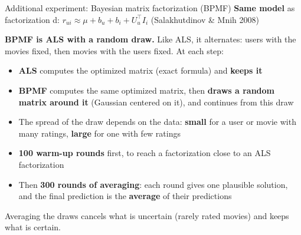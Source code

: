 \documentclass[aspectratio=169,11pt]{beamer}
\newcommand{\key}[1]{\textcolor{accent}{\textbf{#1}}}
\newcommand{\muted}[1]{\textcolor{soft}{#1}}
\newcommand{\takeaway}[1]{\vfill\begin{center}\colorbox{accent!8}{\parbox{0.9\textwidth}{\centering #1}}\end{center}}
\begin{document}
\begin{frame}{Additional experiment: Bayesian matrix factorization (BPMF)}
\textbf{Same model} as factorization d: \;
$r_{ui} \approx \mu + b_u + b_i + U_u^\top I_i$ \; \muted{\footnotesize (Salakhutdinov \& Mnih 2008)}

\vspace{0.8em}
\textbf{BPMF is ALS with a random draw.} Like ALS, it alternates: users with the movies
fixed, then movies with the users fixed. At each step:
\begin{itemize}
  \item \textbf{ALS} computes the optimized matrix (exact formula) and \key{keeps it}
  \item \textbf{BPMF} computes the same optimized matrix, then \key{draws a random matrix around it}
        (Gaussian centered on it), and continues from this draw
\end{itemize}

\vspace{0.4em}
\begin{itemize}
  \item The spread of the draw depends on the data: \key{small} for a user or movie with many
        ratings, \key{large} for one with few ratings
  \item \key{100 warm-up rounds} first, to reach a factorization close to an ALS factorization
  \item Then \key{300 rounds of averaging}: each round gives one plausible solution, and the
        final prediction is the \key{average} of their predictions
\end{itemize}
\takeaway{Averaging the draws cancels what is uncertain (rarely rated movies) and keeps what is certain.}
\end{frame}
\end{document}
